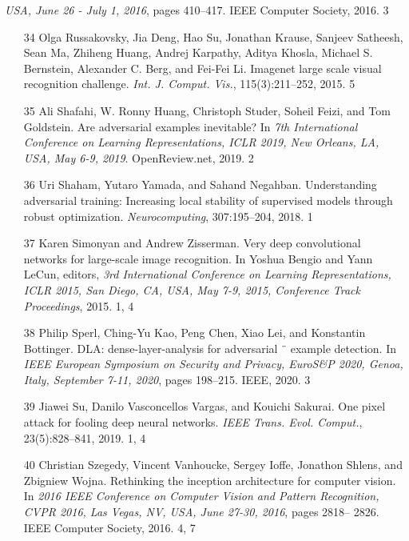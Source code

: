 \documentclass{article}
\begin{document}
\textit{USA, June 26 - July 1, 2016}, pages 410–417. IEEE Computer Society, 2016. 3
\begin{itemize}
\item 
[34] Olga Russakovsky, Jia Deng, Hao Su, Jonathan Krause, Sanjeev Satheesh, Sean Ma, Zhiheng Huang, Andrej Karpathy, Aditya Khosla, Michael S. Bernstein, Alexander C. Berg, and Fei-Fei Li. Imagenet large scale visual recognition challenge. \textit{Int. J. Comput. Vis.}, 115(3):211–252, 2015. 5

\item 
[35] Ali Shafahi, W. Ronny Huang, Christoph Studer, Soheil Feizi, and Tom Goldstein. Are adversarial examples inevitable? In \textit{7th International Conference on Learning Representations, ICLR 2019, New Orleans, LA, USA, May 6-9, 2019}. OpenReview.net, 2019. 2

\item 
[36] Uri Shaham, Yutaro Yamada, and Sahand Negahban. Understanding adversarial training: Increasing local stability of supervised models through robust optimization. \textit{Neurocomputing}, 307:195–204, 2018. 1

\item 
[37] Karen Simonyan and Andrew Zisserman. Very deep convolutional networks for large-scale image recognition. In Yoshua Bengio and Yann LeCun, editors, \textit{3rd International Conference on Learning Representations, ICLR 2015, San Diego, CA, USA, May 7-9, 2015, Conference Track Proceedings}, 2015. 1, 4

\item 
[38] Philip Sperl, Ching-Yu Kao, Peng Chen, Xiao Lei, and Konstantin Bottinger. DLA: dense-layer-analysis for adversarial ¨ example detection. In \textit{IEEE European Symposium on Security and Privacy, EuroS\&P 2020, Genoa, Italy, September 7-11, 2020}, pages 198–215. IEEE, 2020. 3

\item 
[39] Jiawei Su, Danilo Vasconcellos Vargas, and Kouichi Sakurai. One pixel attack for fooling deep neural networks. \textit{IEEE Trans. Evol. Comput.}, 23(5):828–841, 2019. 1, 4

\item 
[40] Christian Szegedy, Vincent Vanhoucke, Sergey Ioffe, Jonathon Shlens, and Zbigniew Wojna. Rethinking the inception architecture for computer vision. In \textit{2016 IEEE Conference on Computer Vision and Pattern Recognition, CVPR 2016, Las Vegas, NV, USA, June 27-30, 2016}, pages 2818– 2826. IEEE Computer Society, 2016. 4, 7


\end{itemize}
\end{document}
